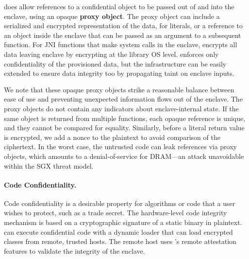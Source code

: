 \sysname{} does allow references to a confidential object to be
passed out of and into the enclave, using an opaque {\bf proxy object}.
The proxy object can include a serialized and encrypted representation of the data, for literals,
or a reference to an object inside the enclave that can be passed as an argument to a subsequent function.
For JNI functions that make system calls in the enclave, \sysname{} encrypts all data leaving enclave by encrypting at the library OS level.
\sysname{} enforces only confidentiality of the provisioned data, but the infrastructure can be easily extended to ensure data integrity too by propagating taint on enclave inputs.

We note that these opaque proxy objects strike a reasonable balance between
ease of use and preventing unexpected information flows out of the enclave.
The proxy objects do not contain any indicators about enclave-internal state.
If the same object is returned from multiple functions, each opaque reference is unique, and they cannot be compared for equality.
Similarly, before a literal return value is encrypted, we add a nonce to the plaintext to avoid comparison of the ciphertext.
In the worst case, the untrusted code can leak references via proxy objects, which amounts to a denial-of-service for DRAM---an attack
unavoidable within the SGX threat model.




\paragraph{Code Confidentiality.}
Code confidentiality is a desirable property for algorithms or code that 
a user wishes to protect, such as a trade secret.
The hardware-level \sgx{} code integrity mechanism is based on a cryptographic
signature of a static binary in plaintext.
\sysname{} can execute confidential code with a dynamic loader that can 
load encrypted classes from remote, trusted hosts.
The remote host uses \sgx{}'s remote attestation features to validate the integrity of the \sysname{} enclave.

